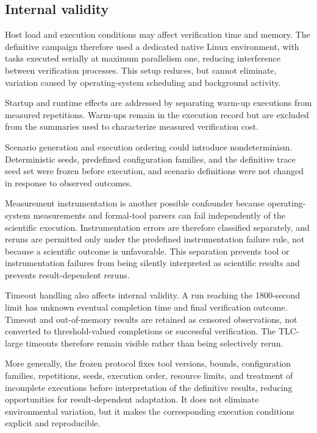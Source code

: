 \subsection{Internal validity}
\label{subsec:internal-validity}

Host load and execution conditions may affect verification time and memory.
The definitive campaign therefore used a dedicated native Linux environment,
with tasks executed serially at maximum parallelism one, reducing interference
between verification processes. This setup reduces, but cannot eliminate,
variation caused by operating-system scheduling and background activity.

Startup and runtime effects are addressed by separating warm-up executions from
measured repetitions. Warm-ups remain in the execution record but are excluded
from the summaries used to characterize measured verification cost.

Scenario generation and execution ordering could introduce nondeterminism.
Deterministic seeds, predefined configuration families, and the definitive
trace seed set were frozen before execution, and scenario definitions were not
changed in response to observed outcomes.

Measurement instrumentation is another possible confounder because
operating-system measurements and formal-tool parsers can fail independently
of the scientific execution. Instrumentation errors are therefore classified
separately, and reruns are permitted only under the predefined instrumentation
failure rule, not because a scientific outcome is unfavorable. This separation
prevents tool or instrumentation failures from being silently interpreted as
scientific results and prevents result-dependent reruns.

Timeout handling also affects internal validity. A run reaching the
1800-second limit has unknown eventual completion time and final verification
outcome. Timeout and out-of-memory results are retained as censored
observations, not converted to threshold-valued completions or successful
verification. The TLC-large timeouts therefore remain visible rather than
being selectively rerun.

More generally, the frozen protocol fixes tool versions, bounds, configuration
families, repetitions, seeds, execution order, resource limits, and treatment
of incomplete executions before interpretation of the definitive results,
reducing opportunities for result-dependent adaptation. It does not eliminate
environmental variation, but it makes the corresponding execution conditions
explicit and reproducible.

